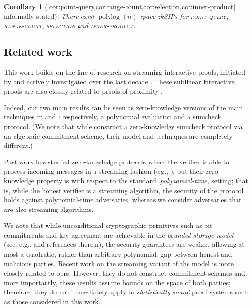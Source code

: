 \documentclass[10pt,a4paper]{article}
\newtheorem{corollary}[theorem]{Corollary}
\theoremstyle{definition}
\newcommand{\zksip}{\textrm{zkSIP}}
\newcommand{\polylog}{\operatorname{polylog}}
\newcommand{\pointquery}{\normalfont\textsc{point-query}\xspace}
\newcommand{\rangecount}{\normalfont\textsc{range-count}\xspace}
\newcommand{\selection}{\normalfont\textsc{selection}\xspace}
\newcommand{\innerproductproblem}{\normalfont\textsc{inner-product}\xspace}
\begin{document}
\begin{corollary}[\cref{cor:point-query,cor:range-count,cor:selection,cor:inner-product}, informally stated]
    \label{infcor:inner-product}
    There exist $\polylog(n)$-space \zksip{}s for \pointquery, \rangecount, \selection and \innerproductproblem.
\end{corollary}

\subsection{Related work}

    This work builds on the line of research on streaming interactive proofs, initiated by \cite{CCM09,CCMT14} and actively investigated over the last decade \cite{CMT13, CTY11, CMT12, CCGT14, T14, GR15, CCMTV15, DTV15, ADRV16, CH18, CCMTV19, G20, CGT20}. These sublinear interactive proofs are also closely related to proofs of proximity \cite{RVW13, G17, GR17, GR18, GGR18, RR20,CG18a, GG21, GLR21, DGRT22}.
    
    Indeed, our two main results can be seen as zero-knowledge versions of the main techniques in \cite{CCMTV19} and \cite{CMT12}: respectively, a polynomial evaluation and a sumcheck protocol. (We note that while \cite{CFGS22} construct a zero-knowledge sumcheck protocol via an algebraic commitment scheme, their model and techniques are completely different.)
    
    Past work has studied zero-knowledge protocols where the verifier is able to process incoming messages in a streaming fashion (e.g., \cite{GKR08,CMT12}), but their zero-knowledge property is with respect to the standard, \emph{polynomial-time}, setting; that is, while the honest verifier is a streaming algorithm, the security of the protocol holds against polynomial-time adversaries, whereas we consider adversaries that are also streaming algorithms.

    We note that while unconditional cryptographic primitives such as bit commitments and key agreement are achievable in the \emph{bounded-storage model} (see, e.g., \cite{GZ19} and references therein), the security guarantees are weaker, allowing at most a quadratic, rather than arbitrary polynomial, gap between honest and malicious parties. Recent work on the streaming variant of the model \cite{DQW22,DQW23} is more closely related to ours. However, they do not construct commitment schemes and, more importantly, these results assume bounds on the space of both parties; therefore, they do not immediately apply to \emph{statistically sound} proof systems such as those considered in this work.
    
\end{document}

